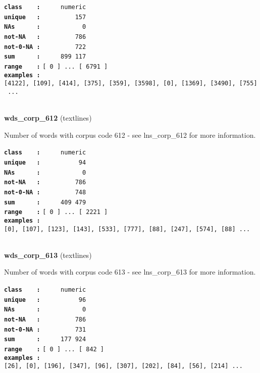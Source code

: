 \documentclass[]{article}
\begin{document}
\textbf{\texttt{class\ \ \ \ :}} \texttt{~~~~~numeric}\\
\textbf{\texttt{unique\ \ \ :}} \texttt{~~~~~~~~~157}\\
\textbf{\texttt{NAs\ \ \ \ \ \ :}} \texttt{~~~~~~~~~~~0}\\
\textbf{\texttt{not-NA\ \ \ :}} \texttt{~~~~~~~~~786}\\
\textbf{\texttt{not-0-NA\ :}} \texttt{~~~~~~~~~722}\\
\textbf{\texttt{sum\ \ \ \ \ \ :}} \texttt{~~~~~899~117}\\
\textbf{\texttt{range\ \ \ \ :}}
\texttt{{[}\ 0\ {]}\ ...\ {[}\ 6791\ {]}}\\
\textbf{\texttt{examples\ :}}
\texttt{{[}4122{]},\ {[}109{]},\ {[}414{]},\ {[}375{]},\ {[}359{]},\ {[}3598{]},\ {[}0{]},\ {[}1369{]},\ {[}3490{]},\ {[}755{]}\ ...}\\

~

\textbf{wds\_corp\_612} (textlines)

Number of words with corpus code 612 - see lns\_corp\_612 for more
information.

\textbf{\texttt{class\ \ \ \ :}} \texttt{~~~~~numeric}\\
\textbf{\texttt{unique\ \ \ :}} \texttt{~~~~~~~~~~94}\\
\textbf{\texttt{NAs\ \ \ \ \ \ :}} \texttt{~~~~~~~~~~~0}\\
\textbf{\texttt{not-NA\ \ \ :}} \texttt{~~~~~~~~~786}\\
\textbf{\texttt{not-0-NA\ :}} \texttt{~~~~~~~~~748}\\
\textbf{\texttt{sum\ \ \ \ \ \ :}} \texttt{~~~~~409~479}\\
\textbf{\texttt{range\ \ \ \ :}}
\texttt{{[}\ 0\ {]}\ ...\ {[}\ 2221\ {]}}\\
\textbf{\texttt{examples\ :}}
\texttt{{[}0{]},\ {[}107{]},\ {[}123{]},\ {[}143{]},\ {[}533{]},\ {[}777{]},\ {[}88{]},\ {[}247{]},\ {[}574{]},\ {[}88{]}\ ...}\\

~

\textbf{wds\_corp\_613} (textlines)

Number of words with corpus code 613 - see lns\_corp\_613 for more
information.

\textbf{\texttt{class\ \ \ \ :}} \texttt{~~~~~numeric}\\
\textbf{\texttt{unique\ \ \ :}} \texttt{~~~~~~~~~~96}\\
\textbf{\texttt{NAs\ \ \ \ \ \ :}} \texttt{~~~~~~~~~~~0}\\
\textbf{\texttt{not-NA\ \ \ :}} \texttt{~~~~~~~~~786}\\
\textbf{\texttt{not-0-NA\ :}} \texttt{~~~~~~~~~731}\\
\textbf{\texttt{sum\ \ \ \ \ \ :}} \texttt{~~~~~177~924}\\
\textbf{\texttt{range\ \ \ \ :}}
\texttt{{[}\ 0\ {]}\ ...\ {[}\ 842\ {]}}\\
\textbf{\texttt{examples\ :}}
\texttt{{[}26{]},\ {[}0{]},\ {[}196{]},\ {[}347{]},\ {[}96{]},\ {[}307{]},\ {[}202{]},\ {[}84{]},\ {[}56{]},\ {[}214{]}\ ...}\\
\end{document}
